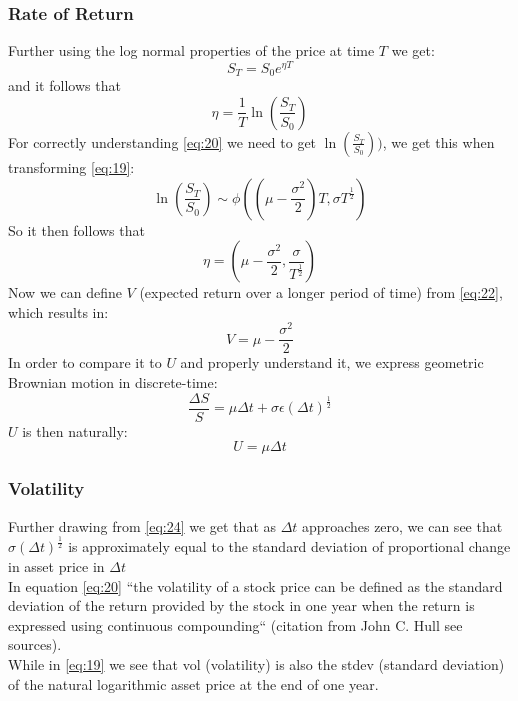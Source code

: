 \documentclass{article}
\begin{document}
\subsubsection{Rate of Return}
Further using the log normal properties of the price at time $T$ we get: 
\begin{equation*}
    S_{T} = S_{0} e^{\eta T}
\end{equation*}
and it follows that 
\begin{equation} \label{eq:20}
    \eta = \frac{1}{T} \ln\left(\frac{S_{T}}{S_{0}}\right)
\end{equation}
For correctly understanding \ref{eq:20} we need to get $\ln\left(\frac{S_{T}}{S_{0}}\right))$, we get this when transforming \ref{eq:19}: 
\begin{equation}
    \ln\left(\frac{S_{T}}{S_{0}}\right) \sim \phi\left(\left(\mu - \frac{\sigma^{2}}{2}\right)T, \sigma T^{\frac{1}{2}}\right)
\end{equation}
So it then follows that 
\begin{equation} \label{eq:22}
    \eta = \left(\mu - \frac{\sigma^{2}}{2}, \frac{\sigma} {T^{\frac{1}{2}}}\right)
\end{equation}
Now we can define $V$ (expected return over a longer period of time) from \ref{eq:22}, which results in:
\begin{equation} \label{eq:23}
    V = \mu - \frac{\sigma^{2}}{2}
\end{equation}
In order to compare it to $U$ and properly understand it, we express geometric Brownian motion in discrete-time:
\begin{equation} \label{eq:24}
    \frac{\Delta S}{S} = \mu \Delta t + \sigma \epsilon (\Delta t)^{\frac{1}{2}}
\end{equation}
$U$ is then naturally:
\begin{equation} \label{eq:25}
    U = \mu \Delta t
\end{equation}
\subsubsection{Volatility}
Further drawing from \ref{eq:24} we get that as $\Delta t$ approaches zero, we can see that $\sigma (\Delta t)^{\frac{1}{2}}$ is approximately equal to the standard deviation of proportional change in asset price in $\Delta t$ \\ [2ex]
In equation \ref{eq:20} “the volatility of a stock price can be defined as the standard deviation of the return provided by the stock in one year when the return is expressed using continuous compounding“ (citation from John C. Hull see sources).\\ [2ex]
While in \ref{eq:19} we see that vol (volatility) is also the stdev (standard deviation) of the natural logarithmic asset price  at the end of one year.
\end{document}
